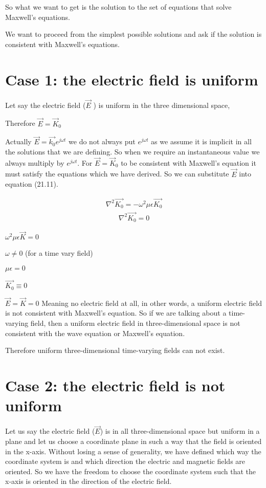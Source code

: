 So what we want to get is the solution to the set of equations that solve Maxwell's equations.

We want to proceed from the simplest possible solutions and ask if the solution is consistent with Maxwell's equations.

\section{Case 1: the electric field is uniform}

Let say the electric field ($\vec{E}$ ) is uniform in the three dimensional space,

Therefore $\vec{E}=\vec{K}_{0}$

Actually $\vec{E}=\vec{k_{0}}e^{j\omega t}$ we do not always put $e^{j\omega t}$ as we assume it is implicit in all the solutions that we are defining. So when we require an instantaneous value we always multiply by $e^{j\omega t}$. For $\vec{E}=\vec{K}_{0}$ to be consistent with Maxwell's equation it must satisfy the equations which we have derived. So we can substitute $\vec{E}$ into equation (21.11).

\begin{align}
\nabla^2\vec{K_{0}}=-\omega^2\mu\epsilon\vec{K_{0}}
\end{align}
\begin{align}
\nabla^2\vec{K_{0}}=0
\end{align}

$\omega^2\mu\epsilon\vec{K}=0$

$\omega\neq0$ (for a time vary field)

$\mu\epsilon=0$

$\vec{K_{0}}\equiv0$

$\vec{E}=\vec{K}=0$ Meaning no electric field at all, in other words, a uniform electric field is not consistent with Maxwell's equation. So if we are talking about a time-varying field, then a uniform electric field in three-dimensional space is not consistent with the wave equation or Maxwell's equation.

Therefore uniform three-dimensional time-varying fields can not exist.

\section{Case 2: the electric field is not uniform}
Let us say the electric field ($\vec{E}$) is in all three-dimensional space but uniform in a plane and let us choose a coordinate plane in such a way that the field is oriented in the x-axis. Without losing a sense of generality, we have defined which way the coordinate system is and which direction the electric and magnetic fields are oriented. So we have the freedom to choose the coordinate system such that the x-axis is oriented in the direction of the electric field.

